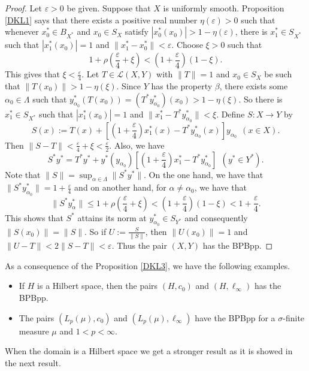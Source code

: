 \documentclass[12pt,a4paper]{amsart}
\theoremstyle{definition}
\newcommand{\e}{\varepsilon}
\numberwithin{equation}{section}
\begin{document}
\begin{proof} Let $\e > 0$ be given. Suppose that $X$ is uniformly smooth. Proposition \ref{DKL1} says that there exists a positive real number $\eta (\e) > 0$ such that whenever $x_0^* \in B_{X^*}$ and $x_0 \in S_X$ satisfy $|x_0^*(x_0)| > 1 - \eta (\e)$, there is $x_1^* \in S_{X^*}$ such that $|x_1^*(x_0)| = 1$ and  $\|x_1^* - x_0^*\| < \e$. Choose $\xi > 0$ such that
\begin{equation}
1 + \rho\left(\frac{\e}{4} + \xi \right) < \left(1 + \frac{\e}{4} \right)(1 - \xi).
\label{propbeta}
\end{equation}
This gives that $\xi < \frac{\e}{4}$. Let $T \in \mathcal{L}(X, Y)$ with $\|T\| = 1$ and $x_0 \in S_X$ be such that $\|T(x_0)\| > 1 - \eta (\xi)$. Since $Y$ has the property $\beta$, there exists some $\alpha_0 \in \Lambda$ such that $y_{\alpha_0}^*(T(x_0)) = (T^*y_{\alpha_0}^*)(x_0) > 1 - \eta (\xi)$. So there is $x_1^* \in S_{X^*}$ such that $|x_1^*(x_0)| = 1$ and $\|x_1^* - T^*y_{\alpha_0}^*\| < \xi$. Define $S: X \longrightarrow Y$ by
\begin{equation*}
S(x) := T(x) + \left[ \left( 1 + \frac{\e}{4} \right) x_1^*(x) - T^*y_{\alpha_0}^*(x) \right] y_{\alpha_0} \ \ (x \in X).
\end{equation*}
Then $\|S - T\| < \frac{\e}{4} + \xi < \frac{\e}{2}$. Also, we have
\begin{equation*}
S^*y^* = T^*y^* + y^*(y_{\alpha_0}) \left[ \left( 1 + \frac{\e}{4} \right) x_1^* - T^* y_{\alpha_0}^* \right] \ \ \left(y^* \in Y^* \right).
\end{equation*} 
Note that $\|S\| = \sup_{\alpha \in \Lambda} \|S^* y^*\|$. On the one hand, we have that $\|S^* y_{\alpha_0}^*\| = 1 + \frac{\e}{4}$ and on another hand, for $\alpha \not= \alpha_0$, we have that
\begin{equation*}
\|S^* y_{\alpha}^*\| \leq 1 + \rho \left( \frac{\e}{4} + \xi \right) < \left(1 + \frac{\e}{4} \right)(1 - \xi) < 1 + \frac{\e}{4}.
\end{equation*}
This shows that $S^*$ attains its norm at $y_{\alpha_0}^* \in S_{Y^*}$ and consequently $\|S(x_0)\| = \|S\|$. So if $U := \frac{S}{\|S\|}$, then $\|U(x_0)\| = 1$ and $\|U - T\| < 2 \|S - T\| < \e$. Thus the pair $(X, Y)$ has the BPBpp.
\end{proof}

As a consequence of the Proposition \ref{DKL3}, we have the following examples.
\begin{itemize}
\item[(a)] If $H$ is a Hilbert space, then the pairs $(H, c_0)$ and $(H, \ell_{\infty})$ has the BPBpp.
\item[(b)] The pairs $(L_p(\mu), c_0)$ and $(L_p(\mu), \ell_{\infty})$ have the BPBpp for a $\sigma$-finite measure $\mu$ and $1 < p < \infty$.
\end{itemize}
When the domain is a Hilbert space we get a stronger result as it is showed in the next result.
\end{document}
